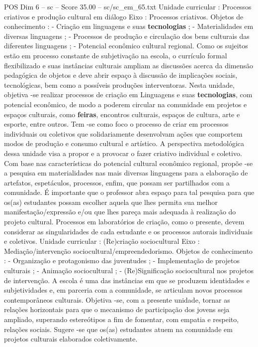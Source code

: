 \begin{textsample}{POS Dim 6 – sc – Score 35.00 – sc/sc\_em\_65.txt}
Unidade curricular : Processos criativos e produção cultural em diálogo Eixo : Processos criativos.
Objetos de conhecimento : - Criação em linguagens e suas \textbf{tecnologias} ; - Materialidades em diversas linguagens ; - Processos de produção e circulação dos bens culturais das diferentes linguagens ; - Potencial econômico cultural regional.
Como os sujeitos estão em processo constante de subjetivação na escola, o currículo formal flexibilizado e suas instâncias culturais ampliam as discussões acerca da dimensão pedagógica de objetos e deve abrir espaço à discussão de implicações sociais, tecnológicas, bem como a possíveis produções interventoras.
Nesta unidade, objetiva -se realizar processos de criação em Linguagens e suas \textbf{tecnologias}, com potencial econômico, de modo a poderem circular na comunidade em projetos e espaços culturais, como \textbf{feiras}, encontros culturais, espaços de cultura, arte e esporte, entre outros.
Tem -se como foco o processo de criar em processos individuais ou coletivos que solidariamente desenvolvam ações que comportem modos de produção e consumo cultural e artístico.
A perspectiva metodológica dessa unidade visa a propor e a provocar o fazer criativo individual e coletivo.
Com base nas características do potencial cultural econômico regional, propõe -se a pesquisa em materialidades nas mais diversas linguagens para a elaboração de artefatos, espetáculos, processos, enfim, que possam ser partilhados com a comunidade.
É importante que o professor abra espaço para tal pesquisa para que os(as) estudantes possam escolher aquela que lhes permita sua melhor manifestação/expressão e/ou que lhes pareça mais adequada à realização do projeto cultural.
Processos em laboratórios de criação, como o presente, devem considerar as singularidades de cada estudante e os processos autorais individuais e coletivos.
Unidade curricular : (Re)criação sociocultural Eixo : Mediação/intervenção sociocultural/empreendedorismo.
Objetos de conhecimento : - Organização e protagonismo das juventudes ; - Implementação de projetos culturais ; - Animação sociocultural ; - (Re)Significação sociocultural nos projetos de intervenção.
A escola é uma das instâncias em que se produzem identidades e subjetividades e, em parceria com a comunidade, se articulam novos processos contemporâneos culturais.
Objetiva -se, com a presente unidade, tornar as relações horizontais para que o mecanismo de participação dos jovens seja ampliado, superando estereótipos a fim de fomentar, com empatia e respeito, relações sociais.
Sugere -se que os(as) estudantes atuem na comunidade em projetos culturais elaborados coletivamente.

\end{textsample}
